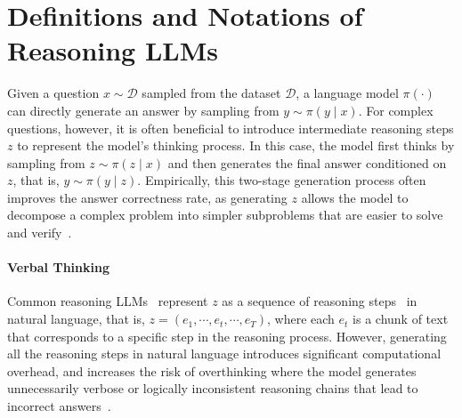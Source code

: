 \documentclass{article} %
\begin{document}
\section{Definitions and Notations of Reasoning LLMs}\label{sec:latent_thinking_llms}
Given a question $x\sim\mathcal{D}$ sampled from the dataset $\mathcal{D}$, a language model $\pi(\cdot)$ can directly generate an answer by sampling from $y \sim \pi(y \mid x)$. For complex questions, however, it is often beneficial to introduce intermediate reasoning steps $z$ to represent the model’s thinking process. 
%
In this case, the model first thinks by sampling from $z \sim \pi(z \mid x)$ and then generates the final answer conditioned on $z$, that is, $y \sim \pi(y \mid z)$. Empirically, this two-stage generation process often improves the answer correctness rate, as generating 
$z$ allows the model to decompose a complex problem into simpler subproblems that are easier to solve and verify~\citep{wei2022chain,kojima2022large}.
\vspace{-0.1cm}
\paragraph*{Verbal Thinking}
\vspace{-0.1cm}
Common reasoning LLMs~\citep{li2025system} represent $z$ as a sequence of reasoning steps~\citep{wei2022chain} in natural language, that is, $z=(e_1,\cdots, e_t, \cdots, e_T)$, where each $e_t$ is a chunk of text that corresponds to a specific step in the reasoning process. 
%
However, generating all the reasoning steps in natural language
introduces significant computational overhead, and increases the risk of overthinking where the model generates unnecessarily verbose or logically inconsistent reasoning chains that lead to incorrect answers~\citep{chen2025do,sui2025stop}.
\vspace{-0.1cm}
\end{document}

